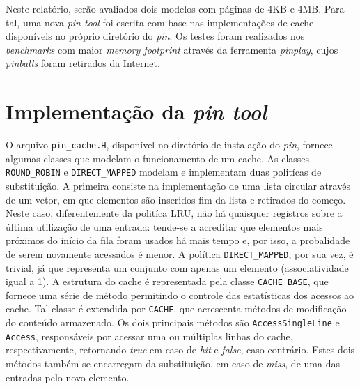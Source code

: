 \documentclass[12pt]{article}
\begin{document}
Neste relatório, serão avaliados dois modelos com páginas de 4KB e 4MB. Para
tal, uma nova \textit{pin tool} foi escrita com base nas implementações de cache
disponíveis no próprio diretório do \textit{pin}. Os testes foram realizados nos
\textit{benchmarks} com maior \textit{memory footprint} através da ferramenta
\textit{pinplay}, cujos \textit{pinballs} foram retirados da Internet.

\section {Implementação da \textit{pin tool}}

O arquivo \texttt{pin\_cache.H}, disponível no diretório de instalação do
\textit{pin}, fornece algumas classes que modelam o funcionamento de um cache.
As classes \texttt{ROUND\_ROBIN} e \texttt{DIRECT\_MAPPED} modelam  e
implementam duas politícas de substituição. A primeira consiste na implementação
de uma lista circular através de um vetor, em que elementos são inseridos fim da
lista e retirados do começo. Neste caso, diferentemente da politíca LRU, não há
quaisquer registros sobre a última utilização de uma entrada: tende-se a
acreditar que elementos mais próximos do início da fila foram usados há mais
tempo e, por isso, a probalidade de serem novamente acessados é menor. A
política \texttt{DIRECT\_MAPPED}, por sua vez, é trivial, já que representa um
conjunto com apenas um elemento (associatividade igual a 1). A estrutura do
cache é representada pela classe \texttt{CACHE\_BASE}, que fornece uma série de
método permitindo o controle das estatísticas dos acessos ao cache. Tal classe é
extendida por \texttt{CACHE}, que acrescenta métodos de modificação do conteúdo
armazenado. Os dois principais métodos são \texttt{AccessSingleLine} e
\texttt{Access}, responsáveis por acessar uma ou múltiplas linhas do cache,
respectivamente, retornando \textit{true} em caso de \textit{hit} e
\textit{false}, caso contrário. Estes dois métodos também se encarregam da
substituição, em caso de \textit{miss}, de uma das entradas pelo novo elemento.
\end{document}
